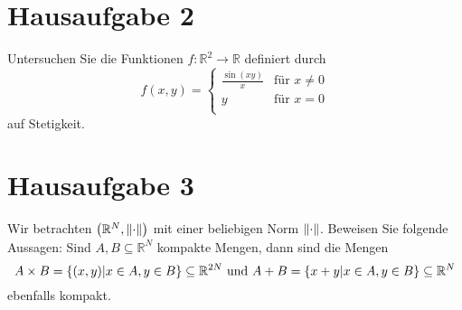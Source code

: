 \documentclass{scrreprt}
\begin{document}
\newpage
\section*{Hausaufgabe 2}

Untersuchen Sie die Funktionen $f \colon \mathbb{R}^2 \to \mathbb{R}$ definiert
durch
\[
  f(x, y) = \begin{cases}
    \frac{\sin(xy)}{x} & \text{für } x \ne 0 \\
    y & \text{für } x = 0 \\
  \end{cases}
\]
auf Stetigkeit.

\newpage
\section*{Hausaufgabe 3}

Wir betrachten $\qty(\mathbb{R}^N, \norm{\cdot})$ mit einer beliebigen Norm
$\norm{\cdot}$.
Beweisen Sie folgende Aussagen: Sind $A, B \subseteq \mathbb{R}^N$ kompakte
Mengen, dann sind die Mengen
\[
  A \times B = \qty{(x, y) \middle| x \in A, y \in B} \subseteq \mathbb{R}^{2N}
  \text{ und }
  A + B = \qty{x + y \middle| x \in A, y \in B} \subseteq \mathbb{R}^N
\]
ebenfalls kompakt.
\end{document}
